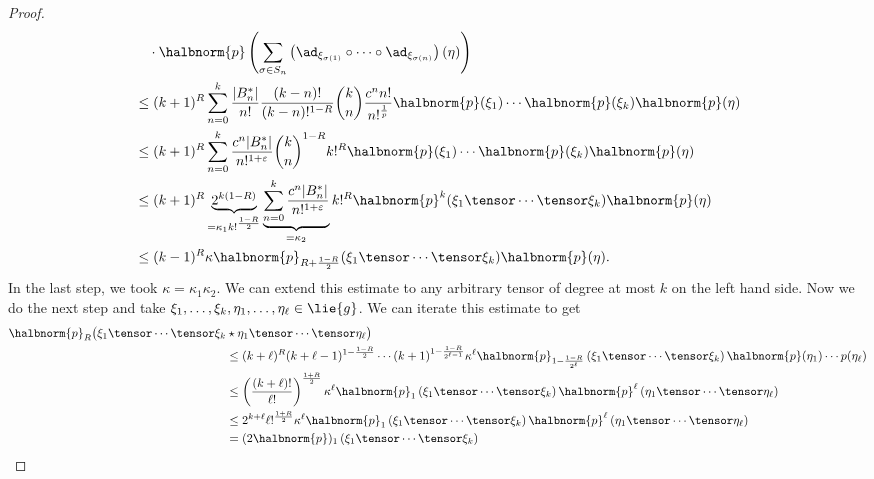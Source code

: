 \documentclass[
11pt,                          %
english                        %
]{article}
\begin{document}
\begin{proof}
\begin{align*}
		& \quad \cdot
		\halbnorm{p} \left(
			\sum	\limits_{\sigma \in S_n}
			\left( 
				\ad_{\xi_{\sigma(1)}} 
				\circ \cdots \circ
				\ad_{\xi_{\sigma(n)}}
			\right)
			(\eta)
		\right)
		\\
		& \leq
		(k + 1)^R
		\sum\limits_{n = 0}^k
		\frac{|B_n^*|}{n!}
		\frac{(k-n)!}{(k-n)!^{1 - R}}
		\binom{k}{n}
		\frac{c^n n!}{n!^{\frac{1}{p}}}
		\halbnorm{p}(\xi_1) \cdots \halbnorm{p}(\xi_k)
		\halbnorm{p}(\eta)
		\\
		& \leq
		(k + 1)^R
		\sum\limits_{n = 0}^k
		\frac{c^n |B_n^*|}{n!^{1 + \varepsilon}}
		\binom{k}{n}^{1-R}
		k!^R
		\halbnorm{p}(\xi_1) \cdots \halbnorm{p}(\xi_k) 
		\halbnorm{p}(\eta)
		\\
		& \leq
		(k + 1)^R
		\underbrace{
			2^{k (1-R)}
		}_{
			=\kappa_1 k!^{\frac{1-R}{2}}
		}
		\underbrace{
			\sum\limits_{n = 0}^k
			\frac{c^n |B_n^*|}{n!^{1 + \varepsilon}}
		}_{
			= \kappa_2
		}
		k!^R
		\halbnorm{p}^k(\xi_1 \tensor \cdots \tensor \xi_k) 
		\halbnorm{p}(\eta)
		\\
		& \leq
		(k-1)^R
		\kappa
		\halbnorm{p}_{R + \frac{1-R}{2}}
		(\xi_1 \tensor \cdots \tensor \xi_k)
		\halbnorm{p}(\eta).
	\end{align*}
	In the last step, we took $\kappa = \kappa_1 \kappa_2$. We can extend this 
	estimate to any arbitrary tensor of degree at most $k$ on the left hand side.
	Now we do the next step and take $\xi_1, \ldots, \xi_k, \eta_1, \ldots, 
	\eta_\ell \in \lie{g}$. We can iterate this estimate to get
	\begin{align*}
		\halbnorm{p}_R \big(
			\xi_1 \tensor \cdots \tensor \xi_k
		&
			\star
			\eta_1 \tensor \cdots \tensor \eta_\ell
		\big)
		\\
		& \leq
		(k + \ell)^R (k + \ell - 1)^{1 - \frac{1 - R}{2}}
		\cdots (k+1)^{{1 - \frac{1 - R}{2^{\ell - 1}}}}
		\kappa^\ell
		\halbnorm{p}_{1 - \frac{1-R}{2^\ell}}
		\left( \xi_1 \tensor \cdots \tensor \xi_k \right)
		\halbnorm{p}(\eta_1) \cdots p(\eta_\ell)
		\\
		& \leq
		\left( \frac{(k+\ell)!}{\ell!} \right)^{\frac{1 + R}{2}}
		\kappa^\ell
		\halbnorm{p}_1 \left( \xi_1 \tensor \cdots \tensor \xi_k \right)
		\halbnorm{p}^\ell \left( \eta_1 \tensor \cdots \tensor \eta_\ell \right)
		\\
		& \leq
		2^{k + \ell}
		\ell!^{\frac{1 + R}{2}}
		\kappa^\ell
		\halbnorm{p}_1 \left( \xi_1 \tensor \cdots \tensor \xi_k \right)
		\halbnorm{p}^\ell \left( \eta_1 \tensor \cdots \tensor \eta_\ell \right)
		\\
		&=
		(2 \halbnorm{p})_1 \left( \xi_1 \tensor \cdots \tensor \xi_k \right)

\end{align*}
\end{proof}
\end{document}
